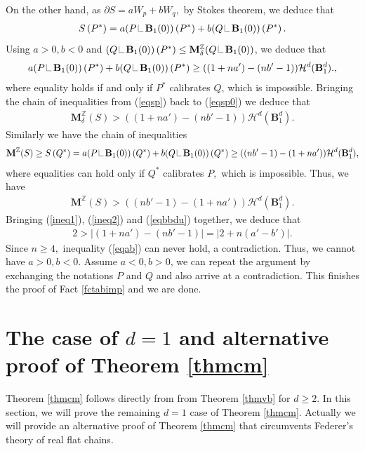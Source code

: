 \documentclass[11pt,a4paper]{amsart}
\numberwithin{equation}{section}
\newcommand{\de}{\delta}
\newcommand\res{\mathop{\hbox{\vrule height 7pt width .3pt depth 0pt
			\vrule height .3pt width 5pt depth 0pt}}\nolimits}
\newcommand{\ms}{\mathbf{M}}
\newcommand{\du}{^\ast}
\newcommand{\pd}{\partial}
\newcommand{\Z}{\mathbb{Z}}
\theoremstyle{plain}
\theoremstyle{definition}
\numberwithin{equation}{subsection}
\begin{document}
On the other hand, as $\pd S=aW_p+bW_q,$ by Stokes theorem, we deduce that
\begin{align}
	S\left( P^\ast\right)=a(P\res \mathbf{B}_1(0))\left( P^\ast\right)+b(Q\res \mathbf{B}_1(0))\left( P^\ast\right).
\end{align}
Using $a>0,b<0$ and $(Q\res \mathbf{B}_1(0))\left( P^\ast\right)\le\ms_\de^{\Z}(Q\res\mathbf{B}_1(0))$, we deduce that
\begin{align}
	a(P\res \mathbf{B}_1(0))\left( P^\ast\right)+b(Q\res \mathbf{B}_1(0))\left( P^\ast\right)\ge ((1+na')-(nb'-1))\mathcal{H}^d(\mathbf{B}_1^{d}).
	\label{eqsp},
\end{align} where equality holds if and only if $P^\ast$ calibrates $Q$, which is impossible. Bringing the chain of inequalities from (\ref{eqsp}) back to (\ref{eqsp0}) we deduce that
\begin{align}
\label{ineq1}	\ms^{\Z}_\de(S)>((1+na')-(nb'-1))\mathcal{H}^d(\mathbf{B}_1^{d}).
\end{align}
Similarly we have the chain of inequalities
	\begin{align*}	\ms^{\Z}(S)\ge S\left(Q^\ast\right)=a(P\res \mathbf{B}_1(0))\left(Q^\ast\right)+b(Q\res \mathbf{B}_1(0))\left(Q^\ast\right)\ge ((nb'-1)-(1+na'))\mathcal{H}^d(\mathbf{B}_1^{d}),
	\end{align*}where equalities can hold only if $Q\du$ calibrates $P,$ which is impossible. Thus, we have
	\begin{align}\label{ineq2}
		\ms^{\Z}(S)> ((nb'-1)-(1+na'))\mathcal{H}^d(\mathbf{B}_1^{d}).
	\end{align}
Bringing (\ref{ineq1}), (\ref{ineq2}) and (\ref{eqbbdu}) together, we deduce that
\begin{align}\label{eqab}
	2> |(1+na')-(nb'-1)|=|2+n(a'-b')|.
\end{align}
Since $n\ge 4,$ inequality (\ref{eqab}) can never hold, a contradiction. Thus, we cannot have $a>0,b<0$. Assume $a<0,b>0$, we can repeat the argument by exchanging the notations $P$ and $Q$ and also arrive at a contradiction. This finishes the proof of Fact \ref{fctabimp} and we are done.	
\section{The case of $d=1$ and alternative proof of Theorem \ref{thmcm}}\label{secd=1}
Theorem \ref{thmcm} follows directly from from Theorem \ref{thmvb} for $d\ge 2.$ In this section, we will prove the remaining $d=1$ case of Theorem \ref{thmcm}. Actually we will provide an alternative proof of Theorem \ref{thmcm} that circumvents Federer's theory of real flat chains.
\end{document}
